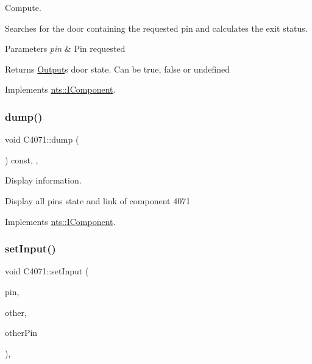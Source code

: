 Compute. 

Searches for the door containing the requested pin and calculates the exit status.


\begin{DoxyParams}{Parameters}
{\em pin} & Pin requested \\
\hline
\end{DoxyParams}
\begin{DoxyReturn}{Returns}
\mbox{\hyperlink{classOutput}{Output}}\textquotesingle{}s door state. Can be true, false or undefined 
\end{DoxyReturn}


Implements \mbox{\hyperlink{classnts_1_1IComponent}{nts\+::\+I\+Component}}.

\mbox{\label{classC4071_a495ed3223c0e31b92abb9f8c9785c789}} 
\subsubsection{\texorpdfstring{dump()}{dump()}}
{\footnotesize\ttfamily void C4071\+::dump (\begin{DoxyParamCaption}{ }\end{DoxyParamCaption}) const\hspace{0.3cm}{\ttfamily [override]}, {\ttfamily [virtual]}, {\ttfamily [noexcept]}}



Display information. 

Display all pins state and link of component 4071 

Implements \mbox{\hyperlink{classnts_1_1IComponent}{nts\+::\+I\+Component}}.

\mbox{\label{classC4071_a48d9c405a1d4ef621b971cdbfd48d65f}} 
\subsubsection{\texorpdfstring{set\+Input()}{setInput()}}
{\footnotesize\ttfamily void C4071\+::set\+Input (\begin{DoxyParamCaption}\item[{std\+::size\+\_\+t}]{pin,  }\item[{\mbox{\hyperlink{classnts_1_1IComponent}{nts\+::\+I\+Component}} \&}]{other,  }\item[{std\+::size\+\_\+t}]{other\+Pin }\end{DoxyParamCaption})\hspace{0.3cm}{\ttfamily [final]}, {\ttfamily [virtual]}}



